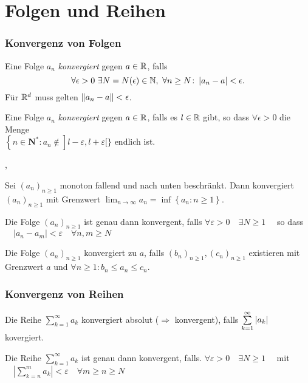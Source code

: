 \part{Folgen und Reihen}

\section{Konvergenz von Folgen}

\Def[1] Eine Folge $a_n$ \emph{konvergiert} gegen $a\in \mathbb{R}$, falls
\[
\forall \epsilon > 0 \ \exists N=N(\epsilon)\in\mathbb{N}, \ \forall n\geq
N \colon \left\lvert a_n-a \right\rvert < \epsilon.
\]
Für $\mathbb{R}^d$ muss gelten $\left\lVert a_n-a \right\rVert < \epsilon$.

\Def[2] Eine Folge $a_n$ \emph{konvergiert} gegen $a\in \mathbb{R}$, falls es $l \in \mathbb{R}$ gibt, so dass $\forall \epsilon > 0$ die Menge \\
$
\left\{n \in \mathbf{N}^{*}: a_{n} \notin\right] l-\varepsilon, l+\varepsilon[\}
$ endlich ist.

\sep

\Satz[Monotone] Sei $\left(a_{n}\right)_{n \geqslant 1}$ monoton fallend und nach unten beschränkt. Dann konvergiert
$\left(a_{n}\right)_{n \geqslant 1}$ mit Grenzwert
$
\lim _{n \rightarrow \infty} a_{n}=\inf \left\{a_{n}: n \geqslant 1\right\}
$.

\Satz[Cauchy] Die Folge $\left(a_{n}\right)_{n \geqslant 1}$ ist genau dann konvergent, falls $\forall \varepsilon>0 \quad \exists N \geqslant 1 \quad$ so dass $\quad\left|a_{n}-a_{m}\right|<\varepsilon \quad \forall n, m \geqslant N$

\Satz[Sandwich] Die Folge $\left(a_{n}\right)_{n \geqslant 1}$ konvergiert zu $a$, falls $\left(b_{n}\right)_{n \geqslant 1}, \left(c_{n}\right)_{n \geqslant 1}$ existieren mit Grenzwert $a$ und $\forall n\geq1 : b_n \leq a_n \leq c_n$.


\section{Konvergenz von Reihen}

\Def Die Reihe $\sum_{k=1}^{\infty} a_{k}$ konvergiert absolut ($\Rightarrow$ konvergent), falls $\sum\limits_{k=1}^{\infty} \left\lvert a_{k} \right\rvert$ kovergiert.

\Satz[Cauchy] Die Reihe $\sum_{k=1}^{\infty} a_{k}$ ist genau dann konvergent, falls. $\forall \varepsilon>0 \quad \exists N \geqslant 1 \quad$ mit $\quad\left|\sum\limits_{k=n}^{m} a_{k}\right|<\varepsilon \quad \forall m \geqslant n \geqslant N$

